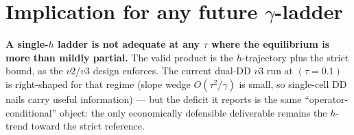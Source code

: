 \documentclass[11pt]{article}
\begin{document}
\section*{Implication for any future $\gamma$-ladder}
\textbf{A single-$h$ ladder is not adequate at any $\tau$ where the
equilibrium is more than mildly partial.} The valid product is the
$h$-trajectory plus the strict bound, as the $v2$/$v3$ design enforces.
The current dual-DD $v3$ run at $(\tau = 0.1)$ is right-shaped for that
regime (slope wedge $O(\tau^2/\gamma)$ is small, so single-cell DD
nails carry useful information) --- but the deficit it reports is the
same ``operator-conditional'' object: the only economically defensible
deliverable remains the $h$-trend toward the strict reference.
\end{document}
